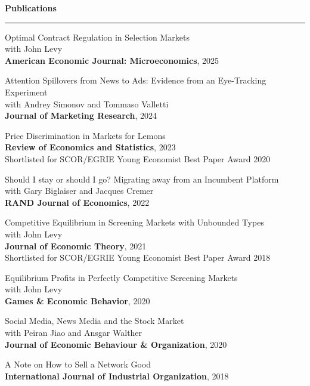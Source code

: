 \documentclass[11pt,a4paper]{article}
\newenvironment{rSection}[1]{%
  \vspace{0.5em}%
  \noindent\textbf{\large #1}%
  \vspace{0.3em}\par
  \hrule
  \vspace{0.5em}
}{%
  \vspace{0.8em}
}
\begin{document}
\begin{rSection}{Publications}
\begin{etaremune}

\item Optimal Contract Regulation in Selection Markets \\
with John Levy \\
\textbf{American Economic Journal: Microeconomics}, 2025

\item Attention Spillovers from News to Ads: Evidence from an Eye-Tracking Experiment \\ 
with Andrey Simonov and Tommaso Valletti \\
\textbf{Journal of Marketing Research}, 2024

\item Price Discrimination in Markets for Lemons \\ 
\textbf{Review of Economics and Statistics}, 2023 \\
Shortlisted for SCOR/EGRIE Young Economist Best Paper Award 2020

\item Should I stay or should I go? Migrating away from an Incumbent Platform \\ 
with Gary Biglaiser and Jacques Cremer \\ 
\textbf{RAND Journal of Economics}, 2022

\item Competitive Equilibrium in Screening Markets with Unbounded Types \\ 
with John Levy \\
\textbf{Journal of Economic Theory}, 2021 \\
Shortlisted for SCOR/EGRIE Young Economist Best Paper Award 2018

\item Equilibrium Profits in Perfectly Competitive Screening Markets \\
with John Levy \\
\textbf{Games \& Economic Behavior}, 2020

\item Social Media, News Media and the Stock Market \\ 
with Peiran Jiao and Ansgar Walther \\
\textbf{Journal of Economic Behaviour \& Organization}, 2020

\item A Note on How to Sell a Network Good \\
\textbf{International Journal of Industrial Organization}, 2018


\end{etaremune}
\end{rSection}
\end{document}
